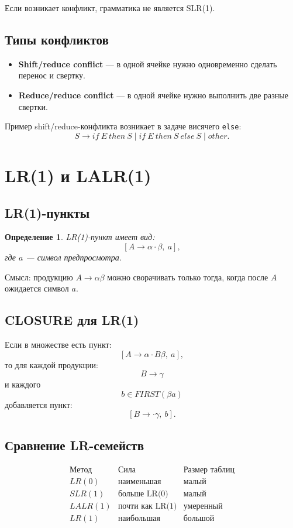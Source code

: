 \documentclass[12pt,a4paper]{article}
\newtheorem{definition}{Определение}
\begin{document}
Если возникает конфликт, грамматика не является SLR(1).

\subsection{Типы конфликтов}

\begin{itemize}
    \item \textbf{Shift/reduce conflict} --- в одной ячейке нужно одновременно сделать перенос и свертку.
    \item \textbf{Reduce/reduce conflict} --- в одной ячейке нужно выполнить две разные свертки.
\end{itemize}

Пример shift/reduce-конфликта возникает в задаче висячего \texttt{else}:
\[
S \to if\ E\ then\ S
\mid if\ E\ then\ S\ else\ S
\mid other.
\]

\section{LR(1) и LALR(1)}

\subsection{LR(1)-пункты}

\begin{definition}
LR(1)-пункт имеет вид:
\[
[A \to \alpha \cdot \beta,\ a],
\]
где $a$ --- символ предпросмотра.
\end{definition}

Смысл: продукцию $A\to\alpha\beta$ можно сворачивать только тогда, когда после $A$ ожидается символ $a$.

\subsection{CLOSURE для LR(1)}

Если в множестве есть пункт:
\[
[A\to\alpha\cdot B\beta,\ a],
\]
то для каждой продукции:
\[
B\to\gamma
\]
и каждого
\[
b \in FIRST(\beta a)
\]
добавляется пункт:
\[
[B\to\cdot\gamma,\ b].
\]

\subsection{Сравнение LR-семейств}

\[
\begin{array}{c|c|c}
\text{Метод} & \text{Сила} & \text{Размер таблиц}\\
\hline
LR(0) & \text{наименьшая} & \text{малый}\\
SLR(1) & \text{больше LR(0)} & \text{малый}\\
LALR(1) & \text{почти как LR(1)} & \text{умеренный}\\
LR(1) & \text{наибольшая} & \text{большой}\\
\end{array}
\]
\end{document}
